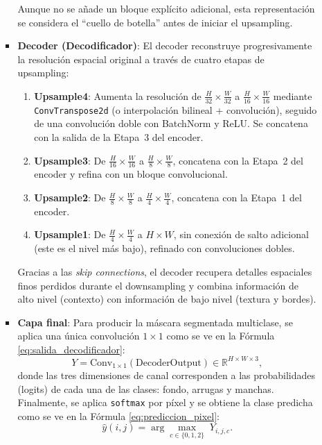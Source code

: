 \begin{enumerate}
\begin{itemize}
\begin{itemize}
    Aunque no se añade un bloque explícito adicional, esta representación se considera el “cuello de botella” antes de iniciar el upsampling.

  \item \textbf{Decoder (Decodificador)}:  
    El decoder reconstruye progresivamente la resolución espacial original a través de cuatro etapas de upsampling:
    \begin{enumerate}
      \item \textbf{Upsample4}: Aumenta la resolución de $\frac{H}{32}\times\frac{W}{32}$ a $\frac{H}{16}\times\frac{W}{16}$ mediante \texttt{ConvTranspose2d} (o interpolación bilineal + convolución), seguido de una convolución doble con BatchNorm y ReLU. Se concatena con la salida de la Etapa 3 del encoder.
      \item \textbf{Upsample3}: De $\frac{H}{16}\times\frac{W}{16}$ a $\frac{H}{8}\times\frac{W}{8}$, concatena con la Etapa 2 del encoder y refina con un bloque convolucional.
      \item \textbf{Upsample2}: De $\frac{H}{8}\times\frac{W}{8}$ a $\frac{H}{4}\times\frac{W}{4}$, concatena con la Etapa 1 del encoder.
      \item \textbf{Upsample1}: De $\frac{H}{4}\times\frac{W}{4}$ a $H\times W$, sin conexión de salto adicional (este es el nivel más bajo), refinado con convoluciones dobles.
    \end{enumerate}
    Gracias a las \textit{skip connections}, el decoder recupera detalles espaciales finos perdidos durante el downsampling y combina información de alto nivel (contexto) con información de bajo nivel (textura y bordes).

  \item \textbf{Capa final}:  
    Para producir la máscara segmentada multiclase, se aplica una única convolución $1\times1$ como se ve en la Fórmula \ref{eq:salida_decodificador}:
    \begin{equation}\label{eq:salida_decodificador}
      Y = \mathrm{Conv}_{1\times1}(\text{DecoderOutput}) \in \mathbb{R}^{H\times W\times 3},
  \end{equation}
    donde las tres dimensiones de canal corresponden a las probabilidades (logits) de cada una de las clases: fondo, arrugas y manchas. Finalmente, se aplica \texttt{softmax} por píxel y se obtiene la clase predicha como se ve en la Fórmula \ref{eq:prediccion_pixel}:
    \begin{equation}\label{eq:prediccion_pixel}
      \hat{y}(i,j) = \arg\max_{c\in\{0,1,2\}} \;Y_{i,j,c}.
  \end{equation}
\end{itemize}


\end{itemize}
\end{enumerate}
